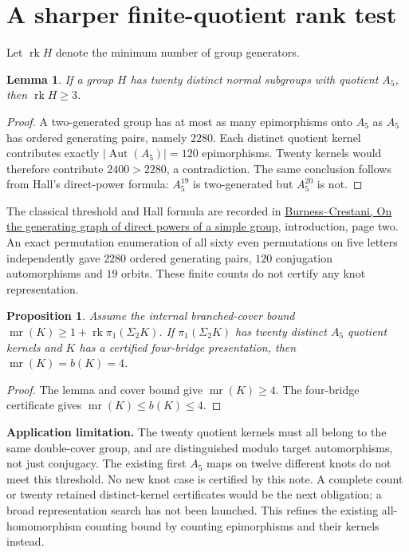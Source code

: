 \documentclass[11pt]{article}
\newtheorem{proposition}{Proposition}
\newtheorem{lemma}{Lemma}
\begin{document}
\section{A sharper finite-quotient rank test}
Let $\operatorname{rk}H$ denote the minimum number of group generators.

\begin{lemma}
If a group $H$ has twenty distinct normal subgroups with quotient $A_5$,
then $\operatorname{rk}H\ge3$.
\end{lemma}
\begin{proof}
A two-generated group has at most as many epimorphisms onto $A_5$ as
$A_5$ has ordered generating pairs, namely $2280$.
Each distinct quotient kernel contributes exactly
$|\operatorname{Aut}(A_5)|=120$ epimorphisms.
Twenty kernels would therefore contribute $2400>2280$, a contradiction.
The same conclusion follows from Hall's direct-power formula:
$A_5^{19}$ is two-generated but $A_5^{20}$ is not.
\end{proof}

The classical threshold and Hall formula are recorded in
\href{https://seis.bristol.ac.uk/~tb13602/docs/BC_1.pdf}
{Burness--Crestani, On the generating graph of direct powers of a simple
group}, introduction, page two. An exact permutation enumeration of all
sixty even permutations on five letters independently gave $2280$ ordered
generating pairs, $120$ conjugation automorphisms and $19$ orbits.
These finite counts do not certify any knot representation.

\begin{proposition}
Assume the internal branched-cover bound
$\operatorname{mr}(K)\ge1+\operatorname{rk}\pi_1(\Sigma_2K)$.
If $\pi_1(\Sigma_2K)$ has twenty distinct $A_5$ quotient kernels and $K$
has a certified four-bridge presentation, then
$\operatorname{mr}(K)=b(K)=4$.
\end{proposition}
\begin{proof}
The lemma and cover bound give $\operatorname{mr}(K)\ge4$.
The four-bridge certificate gives $\operatorname{mr}(K)\le b(K)\le4$.
\end{proof}

\textbf{Application limitation.}
The twenty quotient kernels must all belong to the same double-cover group,
and are distinguished modulo target automorphisms, not just conjugacy.
The existing first $A_5$ maps on twelve different knots do not meet this
threshold. No new knot case is certified by this note. A complete count or
twenty retained distinct-kernel certificates would be the next obligation;
a broad representation search has not been launched. This refines the
existing all-homomorphism counting bound by counting epimorphisms and their
kernels instead.
\end{document}
